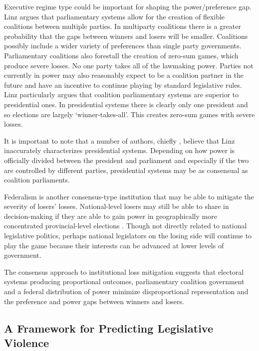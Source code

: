 \documentclass[a4paper]{article}\usepackage{graphicx, color}
\begin{document}
Executive regime type could be important for shaping the power/preference gap. Linz \citeyearpar{LinzPres1990, LinzParl1990} argues that parliamentary systems allow for the creation of flexible coalitions between multiple parties. In multiparty coalitions there is a greater probability that the gaps between winners and losers will be smaller. Coalitions possibly include a wider variety of preferences than single party governments. Parliamentary coalitions also forestall the creation of zero-sum games, which produce severe losses. No one party takes all of the lawmaking power. Parties not currently in power may also reasonably expect to be a coalition partner in the future and have an incentive to continue playing by standard legislative rules. Linz particularly argues that coalition parliamentary systems are superior to presidential ones. In presidential systems there is clearly only one president and so elections are largely `winner-takes-all'. This creates zero-sum games with severe losses. 

It is important to note that a number of authors, chiefly \cite{Horowitz1990}, believe that Linz inaccurately characterizes presidential systems. Depending on how power is officially divided between the president and parliament and especially if the two are controlled by different parties, presidential systems may be as consensual as coalition parliaments.

Federalism is another consensus-type institution that may be able to mitigate the severity of losers' losses. National-level losers may still be able to share in decision-making if they are able to gain power in geographically more concentrated provincial-level elections \citep{Anderson2005, Lijphart2004}. Though not directly related to national legislative politics, perhaps national legislators on the losing side will continue to play the game because their interests can be advanced at lower levels of government. 

The consensus approach to institutional loss mitigation suggests that electoral systems producing proportional outcomes, parliamentary coalition government and a federal distribution of power minimize disproportional representation and the preference and power gaps between winners and losers. 

\vspace{0.5cm}

\subsection{A Framework for Predicting Legislative Violence}
\end{document}

